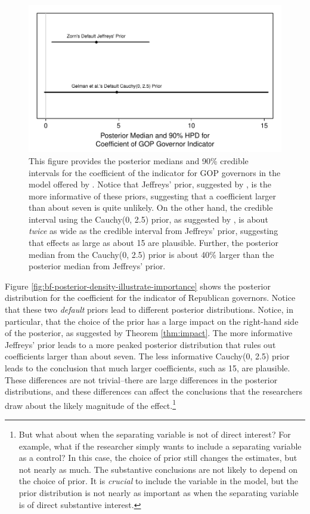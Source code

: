 \documentclass[12pt]{article}
\begin{document}
\begin{figure}[H]
\begin{center}
\includegraphics[scale = .8]{figs/br-coef-illustrate-importance.pdf}
\caption{This figure provides the posterior medians and 90\% credible intervals for the coefficient of the indicator for GOP governors in the model offered by \cite{BarrilleauxRainey2014}. Notice that Jeffreys' prior, suggested by \cite{Zorn2005}, is the more informative of these priors, suggesting that a coefficient larger than about seven is quite unlikely. On the other hand, the credible interval using the Cauchy(0, 2.5) prior, as suggested by \cite{Gelmanetal2008}, is about \emph{twice} as wide as the credible interval from Jeffreys' prior, suggesting that effects as large as about 15 are plausible. Further, the posterior median from the Cauchy(0, 2.5) prior is about 40\% larger than the posterior median from Jeffreys' prior.}\label{fig:br-coef-illustrate-importance}
\end{center}
\end{figure}

Figure \ref{fig:bf-posterior-density-illustrate-importance} shows the posterior distribution for the coefficient for the indicator of Republican governors. Notice that these two \emph{default} priors lead to different posterior distributions. Notice, in particular, that the choice of the prior has a large impact on the right-hand side of the posterior, as suggested by Theorem \ref{thm:impact}. The more informative Jeffreys' prior leads to a more peaked posterior distribution that rules out coefficients larger than about seven. The less informative Cauchy(0, 2.5) prior leads to the conclusion that much larger coefficients, such as 15, are plausible. These differences are not trivial--there are large differences in the posterior distributions, and these differences can affect the conclusions that the researchers draw about the likely magnitude of the effect.\footnote{But what about when the separating variable is not of direct interest? For example, what if the researcher simply wants to include a separating variable as a control? In this case, the choice of prior still changes the estimates, but not nearly as much. The substantive conclusions are not likely to depend on the choice of prior. It is \textit{crucial} \cite{Zorn2005} to include the variable in the model, but the prior distribution is not nearly as important as when the separating variable is of direct substantive interest.}
\end{document}
